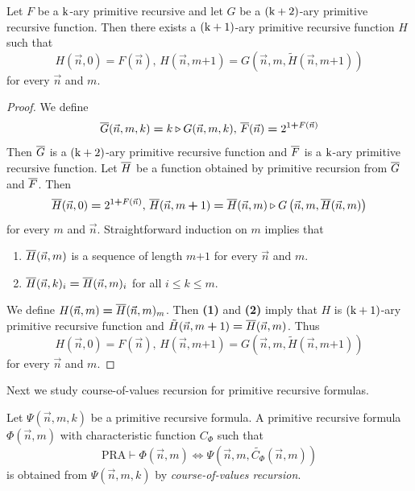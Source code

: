 \documentclass[10pt]{amsart}
\newcommand{\mequiv}{\boldsymbol{\Leftrightarrow}}
\newcommand{\mleq}{\boldsymbol{\leq}}
\newcommand{\meq}{\boldsymbol{=}}
\newcommand{\mplus}{\boldsymbol{+}}
\begin{document}
\begin{proposition}\label{proposition:course_of_values_recursion}
	Let $F$ be a $\rm{k}$-ary primitive recursive and let $G$ be a $\rm{(k + 2)}$-ary primitive recursive function. Then there exists a $\rm{(k + 1)}$-ary primitive recursive function $H$ such that
	$$H(\vec{n},0) \meq F(\vec{n}),\,H(\vec{n},m \mplus 1) \meq G\left(\vec{n},m,\tilde{H}(\vec{n},m \mplus 1)\right)$$
	for every $\vec{n}$ and $m$.
\end{proposition}
\begin{proof}
	We define
	$$\ol{G}(\vec{n},m,k) \meq k \triangleright G(\vec{n},m,k),\,\ol{F}(\vec{n}) \meq 2^{1 \mplus F(\vec{n})}$$
	Then $\overline{G}$ is a $\rm{(k + 2)}$-ary primitive recursive function and $\overline{F}$ is a $\rm{k}$-ary primitive recursive function. Let $\overline{H}$ be a function obtained by primitive recursion from $\overline{G}$ and $\overline{F}$. Then
	$$\ol{H}(\vec{n},0) \meq 2^{1 \mplus F(\vec{n})},\,\ol{H}(\vec{n},m \mplus 1) \meq \ol{H}(\vec{n},m) \triangleright G\left(\vec{n},m,\ol{H}(\vec{n},m)\right)$$
	for every $m$ and $\vec{n}$. Straightforward induction on $m$ implies that
	\begin{enumerate}[label=\textbf{(\arabic*)}, leftmargin=3.0em]
		\item $\overline{H}(\vec{n},m)$ is a sequence of length $m \mplus 1$ for every $\vec{n}$ and $m$.
		\item $\ol{H}(\vec{n},k)_i \meq \ol{H}(\vec{n},m)_i$ for all $i \mleq k \mleq m$.
	\end{enumerate}
	We define $H(\vec{n},m) \meq \ol{H}(\vec{n},m)_m$. Then \textbf{(1)} and \textbf{(2)} imply that $H$ is $\rm{(k + 1)}$-ary primitive recursive function and $\tilde{H}(\vec{n},m \mplus 1) \meq \ol{H}(\vec{n},m)$. Thus
	$$H(\vec{n},0) \meq F(\vec{n}),\,H(\vec{n},m \mplus 1) \meq G\left(\vec{n},m,\tilde{H}(\vec{n},m \mplus 1)\right)$$
	for every $\vec{n}$ and $m$.
\end{proof}
\noindent
Next we study course-of-values recursion for primitive recursive formulas.

\begin{definition}
	Let $\Psi(\vec{n},m,k)$ be a primitive recursive formula. A primitive recursive formula $\Phi(\vec{n},m)$ with characteristic function $C_{\Phi}$ such that
	$$\mathrm{PRA}\vdash \Phi(\vec{n},m) \mequiv \Psi\left(\vec{n},m,\widetilde{C_{\Phi}}(\vec{n},m)\right)$$
	is obtained from $\Psi(\vec{n},m,k)$ by \textit{course-of-values recursion}.
\end{definition}
\end{document}

